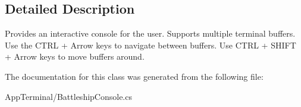 \subsection{Detailed Description}
Provides an interactive console for the user. Supports multiple terminal buffers. Use the C\-T\-R\-L + Arrow keys to navigate between buffers. Use C\-T\-R\-L + S\-H\-I\-F\-T + Arrow keys to move buffers around.

The documentation for this class was generated from the following file\-:\begin{DoxyCompactItemize}
\item 
App\-Terminal/Battleship\-Console.\-cs\end{DoxyCompactItemize}
